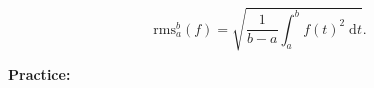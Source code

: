 \documentclass{article}
\newcommand{\diff}{\;\mathrm{d}}
\begin{document}
\[\mathrm{rms}_a^b(f)=\sqrt{\frac{1}{b-a}\int_a^b f(t)^2\diff t}.\]
















\clearpage


















\textbf{Practice:}\bigskip
\end{document}
